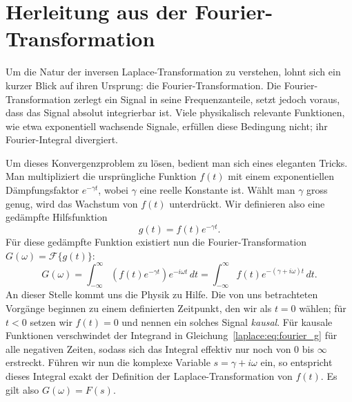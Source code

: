 \section{Herleitung aus der Fourier-Transformation}
\label{laplace:subsection:herleitung}
%

Um die Natur der inversen Laplace-Transformation zu verstehen, lohnt sich ein kurzer Blick auf ihren Ursprung: die Fourier-Transformation.
Die Fourier-Transformation zerlegt ein Signal in seine Frequenzanteile, setzt jedoch voraus, dass das Signal absolut integrierbar ist.
%
%
Viele physikalisch relevante Funktionen, wie etwa exponentiell wachsende Signale, erfüllen diese Bedingung nicht; ihr Fourier-Integral divergiert.
%

Um dieses Konvergenzproblem zu lösen, bedient man sich eines eleganten Tricks.
Man multipliziert die ursprüngliche Funktion $f(t)$ mit einem exponentiellen Dämpfungsfaktor $e^{-\gamma t}$, wobei $\gamma$ eine reelle Konstante ist.
Wählt man $\gamma$ gross genug, wird das Wachstum von $f(t)$ unterdrückt.
Wir definieren also eine gedämpfte Hilfsfunktion
%
\begin{equation}
    g(t) = f(t) e^{-\gamma t}.
    \label{laplace:eq:hilfsfunktion}
\end{equation}
Für diese gedämpfte Funktion existiert nun die Fourier-Transformation $G(\omega) = \mathcal{F}\{g(t)\}$:
\begin{equation}
    G(\omega) = \int_{-\infty}^{\infty} \left( f(t) e^{-\gamma t} \right) e^{-i\omega t} \, dt = \int_{-\infty}^{\infty} f(t) e^{-(\gamma + i\omega)t} \, dt.
    \label{laplace:eq:fourier_g}
\end{equation}
An dieser Stelle kommt uns die Physik zu Hilfe.
Die von uns betrachteten Vorgänge beginnen zu einem definierten Zeitpunkt, den wir als $t = 0$ wählen; für $t < 0$ setzen wir $f(t) = 0$ und nennen ein solches Signal \emph{kausal}.
%
Für kausale Funktionen verschwindet der Integrand in Gleichung~\eqref{laplace:eq:fourier_g} für alle negativen Zeiten, sodass sich das Integral effektiv nur noch von $0$ bis $\infty$ erstreckt.
Führen wir nun die komplexe Variable $s = \gamma + i\omega$ ein, so entspricht dieses Integral exakt der Definition der Laplace-Transformation von $f(t)$.
Es gilt also $G(\omega) = F(s)$.

